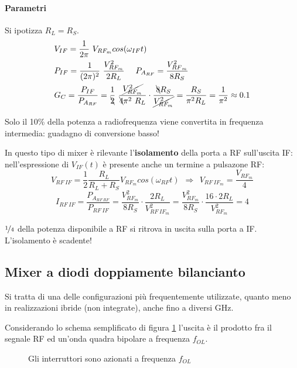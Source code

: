 \paragraph{Parametri}

Si ipotizza $R_L = R_S$.
\begin{align*}
&V_{IF} = \frac{1}{2\pi} ~ V_{RF_m} cos(\omega_{IF} t)\\
&P_{IF} = \frac{1}{(2 \pi)^2} ~ \frac{V_{RF_m}^2}{2 R_L} ~~~~ {P_{A_{RF}}} = \frac{V^2_{{RF}_m}}{8R_S}\\
&G_C = \frac{P_{IF}}{{P_{A_{RF}}}} = \frac{1}{\bcancel{2}} ~ \frac{\cancel{V_{RF_m}^2}}{\bcancel{4}\pi^2 ~ R_L} \cdot \frac{\bcancel{8}R_S}{\cancel{V_{RF_m}^2}} = \frac{R_S}{\pi^2 R_L} = \frac{1}{\pi^2} \approx 0.1
\end{align*}

Solo il 10\% della potenza a radiofrequenza viene convertita in frequenza intermedia: guadagno di conversione basso!

In questo tipo di mixer è rilevante l'\textbf{isolamento} della porta a RF sull'uscita IF: nell'espressione di $V_{IF}(t)$ è presente anche un termine a pulsazone RF:
$$
V_{RF~IF} = \frac{1}{2} \frac{R_L}{R_L + R_S} V_{{RF}_m} cos(\omega_{RF} t) ~~ \Rightarrow ~~ V_{{RF~IF}_m} = \frac{V_{{RF}_m}}{4}$$
$$I_{RF~IF} = \frac{P_{A_{RF~RF}}}{P_{RF~IF}} = 
\frac{V^2_{{RF}_m}}{8R_S} \cdot
\frac{2 R_L}{V_{{RF~IF}_m}^2} =
\frac{V^2_{{RF}_m}}{8R_S} \cdot
\frac{16 \cdot 2 R_L}{V_{{RF}_m}^2} = 4
$$

$\nicefrac{1}{4}$ della potenza disponibile a RF si ritrova in uscita sulla porta a IF. L'isolamento è scadente!

\subsection{Mixer a diodi doppiamente bilancianto}
Si tratta di una delle configurazioni più frequentemente utilizzate, quanto meno in realizzazioni
ibride (non integrate), anche fino a diversi GHz.

Considerando lo schema semplificato di figura \ref{fig:mixer-diodi-doppiamente-semplificato} l'uscita è il prodotto fra il segnale RF ed un'onda quadra bipolare a frequenza $f_{OL}$.

\begin{figure}[h]
	\hspace{\fill}
	\hspace{\fill}
	\hspace{\fill}
	\caption{Gli interruttori sono azionati a frequenza $f_{OL}$}
	\label{fig:mixer-diodi-doppiamente-semplificato}
\end{figure}

